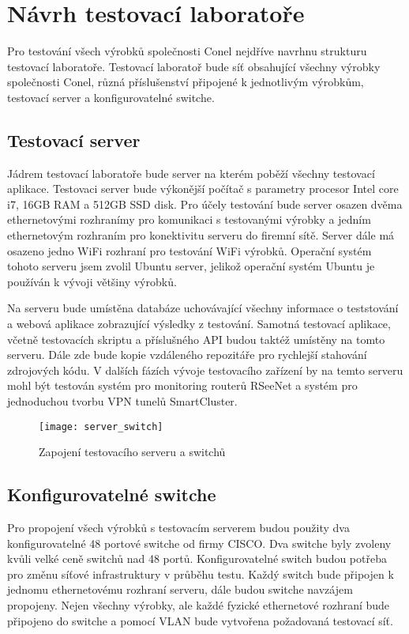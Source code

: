 \chapter{Návrh testovací laboratoře}

Pro testování všech výrobků společnosti Conel nejdříve navrhnu strukturu testovací laboratoře.  Testovací laboratoř bude síť obsahující všechny výrobky společnosti Conel, různá příslušenství připojené k jednotlivým výrobkům, testovací server a konfigurovatelné switche.

\section{Testovací server}
Jádrem testovací laboratoře bude server na kterém poběží všechny testovací aplikace. Testovaci server bude výkonější počítač s parametry procesor Intel core i7, 16GB RAM a 512GB SSD disk. Pro účely testování bude server osazen dvěma ethernetovými rozhranímy pro komunikaci s testovanými výrobky a jedním ethernetovým rozhraním pro konektivitu serveru do firemní sítě. Server dále má osazeno jedno WiFi rozhraní pro testování WiFi výrobků.  Operační systém tohoto serveru jsem zvolil Ubuntu server, jelikož operační systém Ubuntu je používán k vývoji většiny výrobků.

Na serveru bude umístěna databáze uchovávající všechny informace o teststování a webová aplikace zobrazující výsledky z testování. Samotná testovací aplikace, včetně testovacích skriptu a příslušného API budou taktéž umístěny na tomto serveru. Dále zde bude kopie vzdáleného repozitáře pro rychlejší stahování zdrojových kódu. V dalších fázích vývoje testovacího zařízení by na temto serveru mohl být testován systém pro monitoring routerů RSeeNet a systém pro jednoduchou tvorbu VPN tunelů SmartCluster.

\begin{figure}[h]
  \centering
  \texttt{[image: server\_switch]}
  \caption{Zapojení testovacího serveru a switchů}
  \label{fig:server_switch}
\end{figure}

\section{Konfigurovatelné switche}
Pro propojení všech výrobků s testovacím serverem budou použity dva konfigurovatelné 48 portové switche od firmy CISCO. Dva switche byly zvoleny kvůli velké ceně switchů nad 48 portů. Konfigurovatelné switch budou potřeba pro změnu síťové infrastruktury v průběhu testu. Každý switch bude připojen k jednomu ethernetovému rozhraní serveru, dále budou switche navzájem propojeny. Nejen všechny výrobky, ale každé fyzické ethernetové rozhraní bude připojeno do switche a pomocí VLAN bude vytvořena požadovaná testovací síť.

